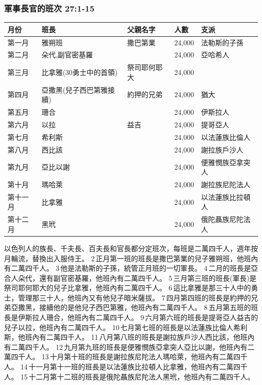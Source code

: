 \subsubsection{軍事長官的班次 27:1-15}
\begin{table}[H]
\centering
\begin{tabular}{p{1.5cm}|p{4.5cm}|p{2.3cm}|p{1.1cm}|p{3.2cm}}\hline\hline
月份    &班長                  & 父親名字      & 人數  & 支派  \\\hline
第一月  &雅朔班                & 撒巴第業     &24,000 & 法勒斯的子孫\\\hline
第二月  &朵代,副官密基羅       &             &24,000 &亞哈希人 \\\hline
第三月  &比拿雅(30勇士中的首領)& 祭司耶何耶大 &24,000 & \\\hline
第四月  &亞撒黑(兒子西巴第雅接續)  & 約押的兄弟   & 24,000 &猶大\\\hline
第五月  &珊合 &   &24,000&伊斯拉人\\\hline
第六月  &以拉  &益吉  &24,000 &提哥亞人  \\\hline
 第七月 &希利斯&  &24,000 &以法蓮族比倫人\\\hline
 第八月& 西比該 &  &24,000 &謝拉族戶沙人\\\hline
 第九月 &亞比以謝 &  &24,000&便雅憫族亞拿突人\\\hline
 第十月&瑪哈萊 &  &24,000& 謝拉族尼陀法人\\\hline
 第十一月&比拿雅 &  &24,000&  以法蓮族比拉頓人\\\hline
 第十二月  &黑玳 &  &24,000&  俄陀聶族尼陀法人 \\\hline
\end{tabular}
\end{table}	 
以色列人的族長、千夫長、百夫長和官長都分定班次，每班是二萬四千人，週年按月輪流，替換出入服侍王。 2 正月第一班的班長是撒巴第業的兒子雅朔班，他班內有二萬四千人。 3 他是法勒斯的子孫，統管正月班的一切軍長。 4 二月的班長是亞合人朵代，還有副官密基羅，他班內有二萬四千人。 5 三月第三班的班長(軍長)是祭司耶何耶大的兒子比拿雅，他班內有二萬四千人。 6 這比拿雅是那三十人中的勇士，管理那三十人，他班內又有他兒子暗米薩拔。 7 四月第四班的班長是約押的兄弟亞撒黑，接續他的是他兒子西巴第雅，他班內有二萬四千人。 8 五月第五班的班長是伊斯拉人珊合，他班內有二萬四千人。 9 六月第六班的班長是提哥亞人益吉的兒子以拉，他班內有二萬四千人。 10 七月第七班的班長是以法蓮族比倫人希利斯，他班內有二萬四千人。 11 八月第八班的班長是謝拉族戶沙人西比該，他班內有二萬四千人。 12 九月第九班的班長是便雅憫族亞拿突人亞比以謝，他班內有二萬四千人。 13 十月第十班的班長是謝拉族尼陀法人瑪哈萊，他班內有二萬四千人。 14 十一月第十一班的班長是以法蓮族比拉頓人比拿雅，他班內有二萬四千人。 15 十二月第十二班的班長是俄陀聶族尼陀法人黑玳，他班內有二萬四千人。

